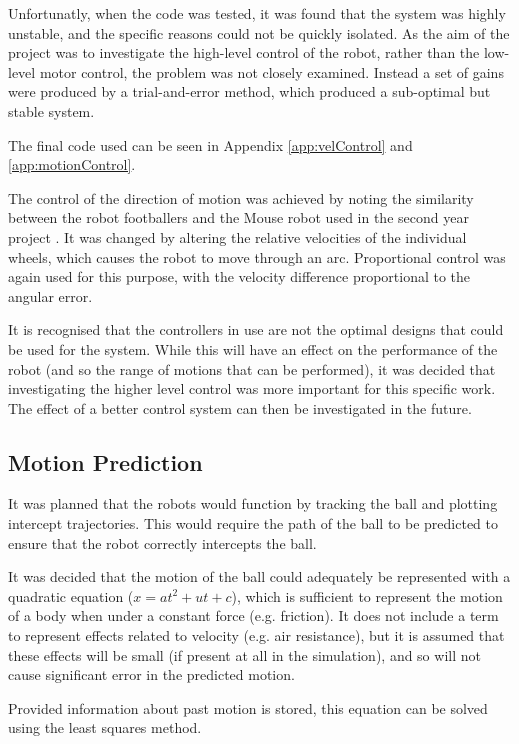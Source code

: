 \documentclass[10pt]{article}
\begin{document}
Unfortunatly, when the code was tested, it was found that the system was highly
unstable, and the specific reasons could not be quickly isolated.  As the aim of
the project was to investigate the high-level control of the robot, rather than
the low-level motor control, the problem was not closely examined.  Instead a
set of gains were produced by a trial-and-error method, which produced a
sub-optimal but stable system.

The final code used can be seen in Appendix \ref{app:velControl} and 
\ref{app:motionControl}.

The control of the direction of motion was achieved by noting the similarity
between the robot footballers and the Mouse robot used in the second year
project \cite{mouseProjectReport}.  It was changed by altering the relative
velocities of the individual wheels, which causes the robot to move through an
arc.  Proportional control was again used for this purpose, with the velocity
difference proportional to the angular error.

It is recognised that the controllers in use are not the optimal designs that
could be used for the system.  While this will have an effect on the performance
of the robot (and so the range of motions that can be performed), it was decided
that investigating the higher level control was more important for this specific
work.  The effect of a better control system can then be investigated in the
future.

\subsection{Motion Prediction}
It was planned that the robots would function by tracking the ball and plotting
intercept trajectories.  This would require the path of the ball to be predicted
to ensure that the robot correctly intercepts the ball.

It was decided that the motion of the ball could adequately be represented with
a quadratic equation ($x=at^2+ut+c$), which is sufficient to represent the
motion of a body when under a constant force (e.g. friction).  It does not
include a term to represent effects related to velocity (e.g. air resistance),
but it is assumed that these effects will be small (if present at all in the
simulation), and so will not cause significant error in the predicted motion.

Provided information about past motion is stored, this equation can be solved
using the least squares method.  
\end{document}
